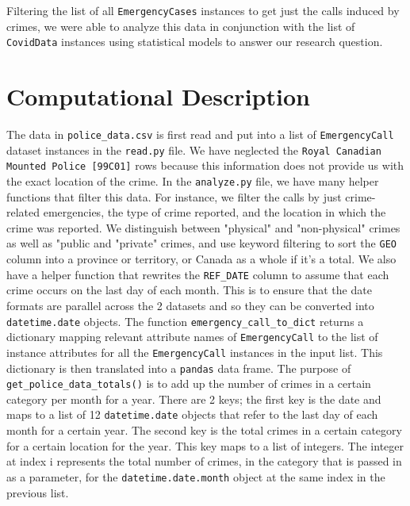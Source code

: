\documentclass[fontsize=11pt]{article}
\begin{document}
Filtering the list of all \verb+EmergencyCases+ instances to get just the calls induced by crimes, we were able to analyze this data in conjunction with the list of \verb+CovidData+ instances using statistical models to answer our research question.


\section{Computational Description}
The data in \verb+police_data.csv+ is first read and put into a list of \verb+EmergencyCall+ dataset instances in the \verb+read.py+ file. We have neglected the \verb+Royal Canadian Mounted Police [99C01]+ rows because this information does not provide us with the exact location of the crime. In the \verb+analyze.py+ file, we have many helper functions that filter this data. For instance, we filter the calls by just crime-related emergencies, the type of crime reported, and the location in which the crime was reported. We distinguish between "physical" and "non-physical" crimes as well as "public and "private" crimes, and use keyword filtering to sort the \verb+GEO+ column into a province or territory, or Canada as a whole if it's a total. We also have a helper function that rewrites the \verb+REF_DATE+ column to assume that each crime occurs on the last day of each month. This is to ensure that the date formats are parallel across the 2 datasets and so they can be converted into \verb+datetime.date+ objects. The function \verb+emergency_call_to_dict+ returns a dictionary mapping relevant attribute names of \verb+EmergencyCall+ to the list of instance attributes for all the \verb+EmergencyCall+ instances in the input list. This dictionary is then translated into a \verb+pandas+ data frame. The purpose of \verb+get_police_data_totals()+ is to add up the number of crimes in a certain category per month for a year. There are 2 keys; the first key is the date and maps to a list of 12 \verb+datetime.date+ objects that refer to the last day of each month for a certain year. The second key is the total crimes in a certain category for a certain location for the year. This key maps to a list of integers. The integer at index i represents the total number of crimes,  in the category that is passed in as a parameter, for the \verb+datetime.date.month+ object at the same index in the previous list.
\end{document}
